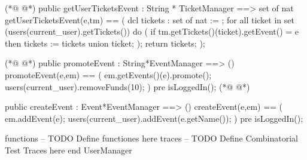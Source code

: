 \begin{vdmpp}[breaklines=true]
(*@
\label{getUserTicketsEvent:71}
@*)
 public getUserTicketsEvent : String * TicketManager ==> set of nat
 getUserTicketsEvent(e,tm) == (
  dcl tickets : set of nat := {};
  for all ticket in set (users(current_user).getTickets()) do 
  (
   if tm.getTickets()(ticket).getEvent() = e
    then tickets := tickets union {ticket};
  );
  return tickets;
 );
 
(*@
\label{promoteEvent:82}
@*)
 public promoteEvent : String*EventManager ==> ()
 promoteEvent(e,em) == (
  em.getEvents()(e).promote();
  users(current_user).removeFunds(10);
 )
 pre isLoggedIn();
(*@
\label{createEvent:88}
@*)
 
 public createEvent : Event*EventManager ==> ()
 createEvent(e,em) == (
  em.addEvent(e);
  users(current_user).addEvent(e.getName());
 )
 pre isLoggedIn();
 
 
 
functions
-- TODO Define functiones here
traces
-- TODO Define Combinatorial Test Traces here
end UserManager
\end{vdmpp}
